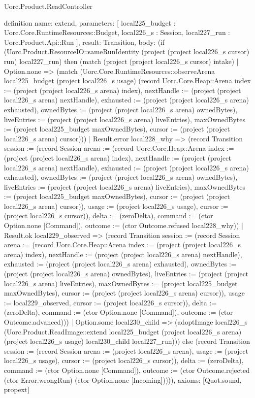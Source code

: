 \begin{lexlean}{Uorc.Product.ReadController}
\begin{semanticmodule}
definition{
  name: extend,
  parameters: [
    local225_budget : Uorc.Core.RuntimeResources::Budget,
    local226_s : Session,
    local227_run : Uorc.Product.Api::Run
  ],
  result: Transition,
  body: (if (Uorc.Product.ResourceIO::sameRunIdentity (project (project local226_s cursor) run) local227_run) then (match (project (project local226_s cursor) intake)
    | Option.none => (match (Uorc.Core.RuntimeResources::observeArena local225_budget (project local226_s usage) (record Uorc.Core.Heap::Arena {index := (project (project local226_s arena) index), nextHandle := (project (project local226_s arena) nextHandle), exhausted := (project (project local226_s arena) exhausted), ownedBytes := (project (project local226_s arena) ownedBytes), liveEntries := (project (project local226_s arena) liveEntries), maxOwnedBytes := (project local225_budget maxOwnedBytes), cursor := (project (project local226_s arena) cursor)}))
      | Result.error local228_why => (record Transition {session := (record Session {arena := (record Uorc.Core.Heap::Arena {index := (project (project local226_s arena) index), nextHandle := (project (project local226_s arena) nextHandle), exhausted := (project (project local226_s arena) exhausted), ownedBytes := (project (project local226_s arena) ownedBytes), liveEntries := (project (project local226_s arena) liveEntries), maxOwnedBytes := (project local225_budget maxOwnedBytes), cursor := (project (project local226_s arena) cursor)}), usage := (project local226_s usage), cursor := (project local226_s cursor)}), delta := (zeroDelta), command := (ctor Option.none [Command]), outcome := (ctor Outcome.refused local228_why)})
      | Result.ok local229_observed => (record Transition {session := (record Session {arena := (record Uorc.Core.Heap::Arena {index := (project (project local226_s arena) index), nextHandle := (project (project local226_s arena) nextHandle), exhausted := (project (project local226_s arena) exhausted), ownedBytes := (project (project local226_s arena) ownedBytes), liveEntries := (project (project local226_s arena) liveEntries), maxOwnedBytes := (project local225_budget maxOwnedBytes), cursor := (project (project local226_s arena) cursor)}), usage := local229_observed, cursor := (project local226_s cursor)}), delta := (zeroDelta), command := (ctor Option.none [Command]), outcome := (ctor Outcome.advanced)}))
    | Option.some local230_child => (adoptImage local226_s (Uorc.Product.ReadImage::extend local225_budget (project local226_s arena) (project local226_s usage) local230_child local227_run))) else (record Transition {session := (record Session {arena := (project local226_s arena), usage := (project local226_s usage), cursor := (project local226_s cursor)}), delta := (zeroDelta), command := (ctor Option.none [Command]), outcome := (ctor Outcome.rejected (ctor Error.wrongRun) (ctor Option.none [Incoming]))})),
  axioms: [Quot.sound, propext]
}


\end{semanticmodule}
\end{lexlean}
